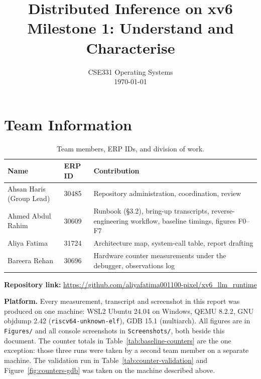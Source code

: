 \documentclass[11pt]{article}
\title{\textbf{Distributed Inference on xv6}\\[4pt]
\large Milestone 1: Understand and Characterise}
\date{CSE331 Operating Systems \\ \today}
\renewcommand{\_}{\origunderscore\allowbreak}
\begin{document}
\maketitle
\thispagestyle{empty}

\newpage
\tableofcontents
\newpage

\section*{Team Information}

\begin{table}[H]
\centering
\begin{tabular}{@{}llp{7.2cm}@{}}
\toprule
\textbf{Name} & \textbf{ERP ID} & \textbf{Contribution} \\
\midrule
Ahsan Haris (Group Lead) & 30485 & Repository administration, coordination, review \\
Ahmed Abdul Rahim & 30609 & Runbook (\S3.2), bring-up transcripts, reverse-engineering workflow, baseline timings, figures F0--F7 \\
Aliya Fatima & 31724 & Architecture map, system-call table, report drafting \\
Bareera Rehan & 30696 & Hardware counter measurements under the debugger, observations log \\
\bottomrule
\end{tabular}
\caption{Team members, ERP IDs, and division of work.}
\end{table}

\noindent\textbf{Repository link:} \url{https://github.com/aliyafatima001100-pixel/xv6_llm_runtime}

\vspace{6pt}
\noindent\textbf{Platform.} Every measurement, transcript and screenshot in this
report was produced on one machine: WSL2 Ubuntu 24.04 on Windows, QEMU 8.2.2,
GNU objdump 2.42 (\texttt{riscv64-unknown-elf}), GDB 15.1 (multiarch). All
figures are in \texttt{Figures/} and all console screenshots in
\texttt{Screenshots/}, both beside this document.
The counter totals in Table~\ref{tab:baseline-counters} are the one exception: those three runs were taken by a second team member on a separate machine. The validation run in Table~\ref{tab:counter-validation} and Figure~\ref{fig:counters-gdb} was taken on the machine described above.
\end{document}
